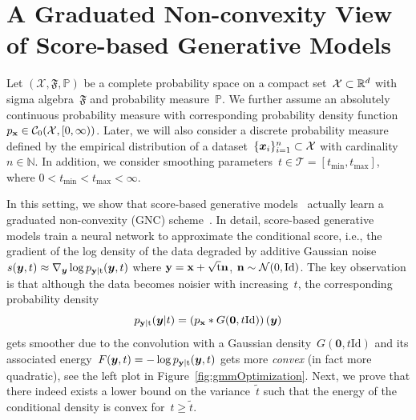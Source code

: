 \documentclass{article}
\newcommand{\N}{\mathbb{N}}
\renewcommand{\P}{\mathbb{P}}
\newcommand{\C}{\mathcal{C}}
\newcommand{\X}{\mathcal{X}}
\newcommand{\T}{\mathcal{T}}
\newcommand{\id}{\mathrm{Id}}
\renewcommand{\vec}[1]{\mathbf{#1}}
\newcommand{\tmin}{t_\mathrm{min}}
\newcommand{\tmax}{t_\mathrm{max}}
\newcommand{\pdf}[1]{p_{#1}}
\theoremstyle{plain}
\theoremstyle{definition}
\theoremstyle{remark}
\begin{document}


\section{A Graduated Non-convexity View of Score-based Generative Models} \label{sec:gnc}
Let $(\X,\mathfrak{F},\P)$ be a complete probability space on a compact set~$\X\subset\R^d$ with sigma algebra~$\mathfrak{F}$ and probability measure~$\P$.
We further assume an absolutely continuous probability measure with corresponding probability density function~$\pdf{\rvx}\in \C_0(\X,[0,\infty))$.
Later, we will also consider a discrete probability measure defined by the empirical distribution of a dataset~$\{\vx_i\}_{i=1}^n\subset\X$ with cardinality~$n\in\N$.
In addition, we consider smoothing parameters~$t\in\T=[\tmin,\tmax]$, where $0<\tmin<\tmax<\infty$.

In this setting, we show that score-based generative models~\citep{SoEr19,HoJa20} actually learn a graduated non-convexity (GNC) scheme~\citep{BlZi87}.
In detail, score-based generative models train a neural network to approximate the conditional score, i.e., the gradient of the log density of the data degraded by additive Gaussian noise~$s(\vy,t)\approx\nabla_\vy\log\pdf{\rvy\vert\rt}(\vy,t)$ where ${\mathbf{y}}={\mathbf{x}}+\sqrt{{\textnormal{t}}}{\mathbf{n}}$, $\rvn\sim\mathcal{N}(0,\id)$.
The key observation is that although the data becomes noisier with increasing~$t$, the corresponding probability density
\[
\pdf{\rvy\vert\rt}(\vy\vert t)=\left(\pdf{\rvx}\ast G(\vec{0},t\id)\right)(\vy)
\]
gets smoother due to the convolution with a Gaussian density~$G(\vec{0},t\id)$ and its associated energy~$F(\vy,t)=-\log\pdf{\rvy\vert\rt}(\vy,t)$ gets more \emph{convex} (in fact more quadratic), see the left plot in Figure~\ref{fig:gmmOptimization}.
Next, we prove that there indeed exists a lower bound on the variance~$\widetilde{t}$ such that the energy of the conditional density is convex for~$t\geq\widetilde{t}$.
\end{document}
